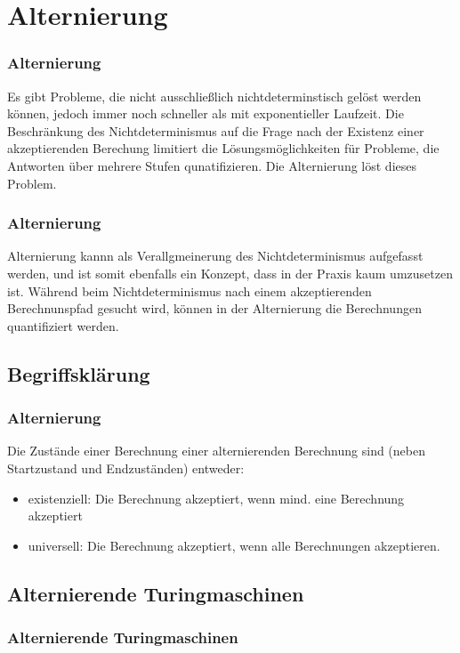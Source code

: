 \section{Alternierung}

\begin{frame}
    \frametitle{Alternierung}
    Es gibt Probleme, die nicht ausschließlich nichtdeterminstisch gelöst werden können, jedoch immer noch schneller als mit exponentieller Laufzeit.
    Die Beschränkung des Nichtdeterminismus auf die Frage nach der Existenz einer akzeptierenden Berechung limitiert die Lösungsmöglichkeiten für Probleme,
    die Antworten über mehrere Stufen qunatifizieren. Die Alternierung löst dieses Problem.
\end{frame}

\begin{frame}
    \frametitle{Alternierung}
    Alternierung kannn als Verallgmeinerung des Nichtdeterminismus aufgefasst werden, und ist somit ebenfalls ein Konzept, dass in der Praxis kaum umzusetzen ist.
    Während beim Nichtdeterminismus nach einem akzeptierenden Berechnunspfad gesucht wird, können in der Alternierung die Berechnungen quantifiziert werden.
\end{frame}

\subsection{Begriffsklärung}
\begin{frame}
    \frametitle{Alternierung}
    Die Zustände einer Berechnung einer alternierenden Berechnung sind (neben Startzustand und Endzuständen) entweder:
    \begin{itemize}
        \item existenziell: Die Berechnung akzeptiert, wenn mind. eine Berechnung akzeptiert
        \item universell: Die Berechnung akzeptiert, wenn alle Berechnungen akzeptieren.
    \end{itemize}

\end{frame}

\subsection{Alternierende Turingmaschinen}
\begin{frame}
    \frametitle{Alternierende Turingmaschinen}
\end{frame}